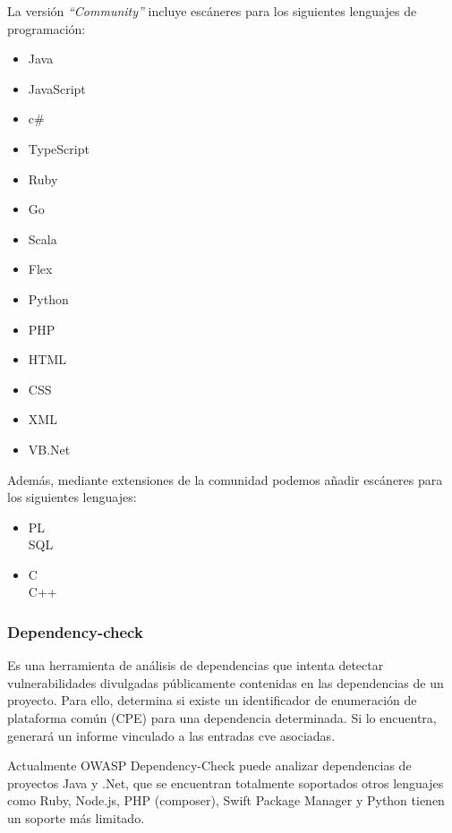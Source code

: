 La versión \emph{“Community”} incluye escáneres para los siguientes lenguajes de programación:

\begin{multicols}{2}
    \begin{itemize}
        \item Java
        \item JavaScript
        \item c\#
        \item TypeScript
        \item Ruby
        \item Go
        \item Scala
        \item Flex 
        \item Python
        \item PHP
        \item HTML 
        \item CSS
        \item XML
        \item VB.Net
    \end{itemize}
\end{multicols}

Además, mediante extensiones de la comunidad podemos añadir escáneres para los siguientes lenguajes:

\begin{itemize}	
    \item PL\\SQL
    \item C\\C++
\end{itemize}    

\subsubsection{Dependency-check}
Es una herramienta de análisis de dependencias que intenta detectar vulnerabilidades divulgadas públicamente contenidas en las dependencias de 
un proyecto. Para ello, determina si existe un identificador de enumeración de plataforma común (CPE) para una dependencia determinada. Si lo encuentra, generará
un informe vinculado a las entradas \gls{cve} asociadas.

Actualmente OWASP Dependency-Check puede analizar dependencias de proyectos Java y .Net, que se encuentran totalmente soportados otros lenguajes como Ruby, Node.js, 
PHP (composer), Swift Package Manager y Python tienen un soporte más limitado.

